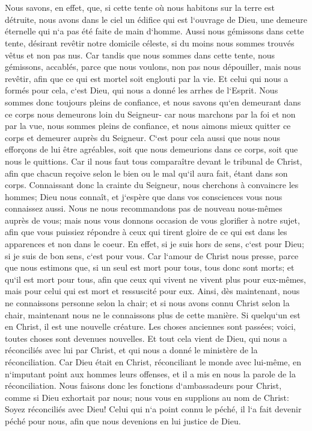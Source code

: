 \chapter{}

\verse Nous savons, en effet, que, si cette tente où nous habitons sur la terre est détruite, nous avons dans le ciel un édifice qui est l`ouvrage de Dieu, une demeure éternelle qui n`a pas été faite de main d`homme. 
\verse Aussi nous gémissons dans cette tente, désirant revêtir notre domicile céleste, 
\verse si du moins nous sommes trouvés vêtus et non pas nus. 
\verse Car tandis que nous sommes dans cette tente, nous gémissons, accablés, parce que nous voulons, non pas nous dépouiller, mais nous revêtir, afin que ce qui est mortel soit englouti par la vie. 
\verse Et celui qui nous a formés pour cela, c`est Dieu, qui nous a donné les arrhes de l`Esprit. 
\verse Nous sommes donc toujours pleins de confiance, et nous savons qu`en demeurant dans ce corps nous demeurons loin du Seigneur- 
\verse car nous marchons par la foi et non par la vue, 
\verse nous sommes pleins de confiance, et nous aimons mieux quitter ce corps et demeurer auprès du Seigneur. 
\verse C`est pour cela aussi que nous nous efforçons de lui être agréables, soit que nous demeurions dans ce corps, soit que nous le quittions. 
\verse Car il nous faut tous comparaître devant le tribunal de Christ, afin que chacun reçoive selon le bien ou le mal qu`il aura fait, étant dans son corps. 
\verse Connaissant donc la crainte du Seigneur, nous cherchons à convaincre les hommes; Dieu nous connaît, et j`espère que dans vos consciences vous nous connaissez aussi. 
\verse Nous ne nous recommandons pas de nouveau nous-mêmes auprès de vous; mais nous vous donnons occasion de vous glorifier à notre sujet, afin que vous puissiez répondre à ceux qui tirent gloire de ce qui est dans les apparences et non dans le coeur. 
\verse En effet, si je suis hors de sens, c`est pour Dieu; si je suis de bon sens, c`est pour vous. 
\verse Car l`amour de Christ nous presse, parce que nous estimons que, si un seul est mort pour tous, tous donc sont morts; 
\verse et qu`il est mort pour tous, afin que ceux qui vivent ne vivent plus pour eux-mêmes, mais pour celui qui est mort et ressuscité pour eux. 
\verse Ainsi, dès maintenant, nous ne connaissons personne selon la chair; et si nous avons connu Christ selon la chair, maintenant nous ne le connaissons plus de cette manière. 
\verse Si quelqu`un est en Christ, il est une nouvelle créature. Les choses anciennes sont passées; voici, toutes choses sont devenues nouvelles. 
\verse Et tout cela vient de Dieu, qui nous a réconciliés avec lui par Christ, et qui nous a donné le ministère de la réconciliation. 
\verse Car Dieu était en Christ, réconciliant le monde avec lui-même, en n`imputant point aux hommes leurs offenses, et il a mis en nous la parole de la réconciliation. 
\verse Nous faisons donc les fonctions d`ambassadeurs pour Christ, comme si Dieu exhortait par nous; nous vous en supplions au nom de Christ: Soyez réconciliés avec Dieu! 
\verse Celui qui n`a point connu le péché, il l`a fait devenir péché pour nous, afin que nous devenions en lui justice de Dieu. 

